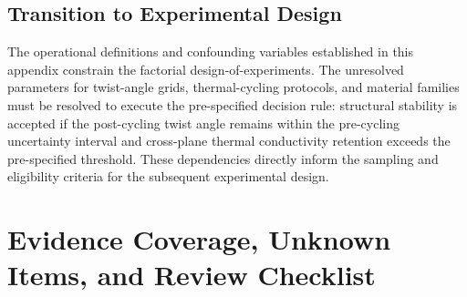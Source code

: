 \documentclass[conference]{IEEEtran}
\begin{document}
\subsection{Transition to Experimental Design}
The operational definitions and confounding variables established in this appendix constrain the factorial design-of-experiments. The unresolved parameters for twist-angle grids, thermal-cycling protocols, and material families must be resolved to execute the pre-specified decision rule: structural stability is accepted if the post-cycling twist angle remains within the pre-cycling uncertainty interval and cross-plane thermal conductivity retention exceeds the pre-specified threshold. These dependencies directly inform the sampling and eligibility criteria for the subsequent experimental design.

\section{Evidence Coverage, Unknown Items, and Review Checklist}
\end{document}
